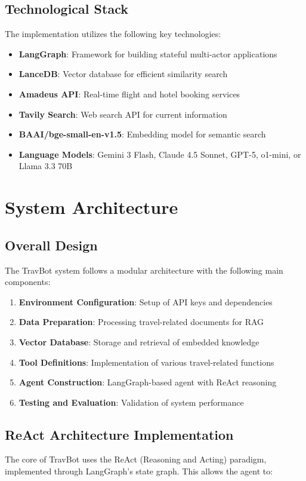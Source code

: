 \documentclass[12pt,a4paper]{article}
\begin{document}
\subsection{Technological Stack}
The implementation utilizes the following key technologies:
\begin{itemize}
\item \textbf{LangGraph}: Framework for building stateful multi-actor applications
\item \textbf{LanceDB}: Vector database for efficient similarity search
\item \textbf{Amadeus API}: Real-time flight and hotel booking services
\item \textbf{Tavily Search}: Web search API for current information
\item \textbf{BAAI/bge-small-en-v1.5}: Embedding model for semantic search
\item \textbf{Language Models}: Gemini 3 Flash, Claude 4.5 Sonnet, GPT-5, o1-mini, or Llama 3.3 70B
\end{itemize}

\section{System Architecture}

\subsection{Overall Design}
The TravBot system follows a modular architecture with the following main components:

\begin{enumerate}
\item \textbf{Environment Configuration}: Setup of API keys and dependencies
\item \textbf{Data Preparation}: Processing travel-related documents for RAG
\item \textbf{Vector Database}: Storage and retrieval of embedded knowledge
\item \textbf{Tool Definitions}: Implementation of various travel-related functions
\item \textbf{Agent Construction}: LangGraph-based agent with ReAct reasoning
\item \textbf{Testing and Evaluation}: Validation of system performance
\end{enumerate}

\subsection{ReAct Architecture Implementation}
The core of TravBot uses the ReAct (Reasoning and Acting) paradigm, implemented through LangGraph's state graph. This allows the agent to:
\end{document}
